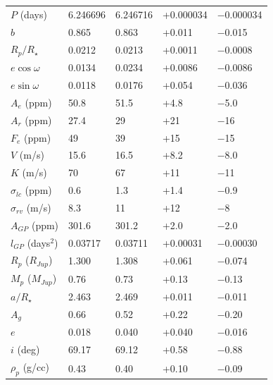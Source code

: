 \documentclass[apjl]{emulateapj}
\begin{document}
\begin{table}
\begin{tabular}{l l l l l}
$P$ 	(days)			&	6.246696		&	6.246716		&	+0.000034	&	$-$0.000034	\\
$b$ 					&	0.865		&	0.863		&	+0.011		&	$-$0.015		\\
$R_{p}/R_{\star}$		&	0.0212		&	0.0213		&	+0.0011		&	$-$0.0008		\\
$e\cos{\omega}$ 		&	0.0134		&	0.0234		&	+0.0086		&	$-$0.0086		\\
$e\sin{\omega}$ 		&	0.0118		&	0.0176		&	+0.054		&	$-$0.036		\\
$A_e$ (ppm)			&	50.8			&	51.5			&	+4.8			&	$-$5.0		\\
$A_r$ (ppm)			&	27.4			&	29			&	+21			&	$-$16		\\
$F_e$ (ppm)			&	49			&	39			&	+15			&	$-$15		\\
$V$ 	(m/s)				&	15.6			&	16.5			&	+8.2			&	$-$8.0		\\
$K$ 	(m/s)				&	70			&	67			&	+11			&	$-$11		\\
$\sigma_{lc}$ (ppm)		&	0.6			&	1.3			&	+1.4			&	$-$0.9		\\
$\sigma_{rv}$ (m/s)		&	8.3			&	11			&	+12			&	$-$8			\\
$A_{GP}$ (ppm)		&	301.6		&	301.2		&	+2.0			&	$-$2.0		\\
$l_{GP}$  (days$^{2}$)	&	0.03717		&	0.03711		&	+0.00031		&	$-$0.00030	\\
%
%
\hline
%
$R_{p}$ ($R_{Jup}$) 	&	1.300		&	1.308		&	+0.061		&	$-$0.074		\\
$M_{p}$ ($M_{Jup}$)	&	0.76			&	0.73			&	+0.13		&	$-$0.13		\\
$a/R_{\star}$			&	2.463		&	2.469		&	+0.011		&	$-$0.011		\\
$A_g$				&	0.66			&	0.52			&	+0.22		&	$-$0.20		\\
$e$					&	0.018		&	0.040		&	+0.040		&	$-$0.016		\\
$i$ (deg)				&	69.17		&	69.12		&	+0.58		&	$-$0.88		\\
$\rho_{p}$ (g/cc) 		&	0.43			&	0.40			&	+0.10		&	$-$0.09		\\
\hline
\end{tabular}
\end{table}
\end{document}
